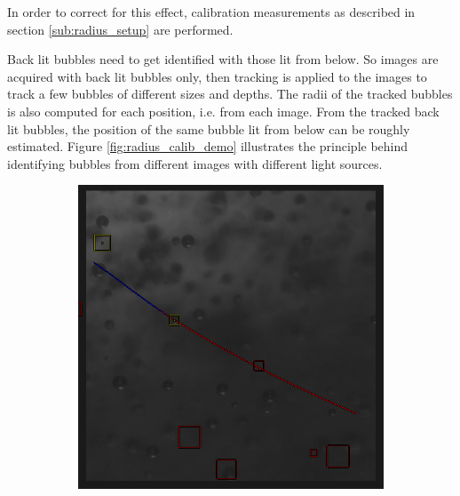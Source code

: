 			In order to correct for this effect, calibration measurements as described in section \ref{sub:radius_setup} are performed.
			
			Back lit bubbles need to get identified with those lit from below. So images are acquired with back lit bubbles only, then tracking is applied to the images to track a few bubbles of different sizes and depths. The radii of the tracked bubbles is also computed for each position, i.e. from each image. From the tracked back lit bubbles, the position of the same bubble lit from below can be roughly estimated. Figure \ref{fig:radius_calib_demo} illustrates the principle behind identifying bubbles from different images with different light sources. 
			
			\begin{figure}	
				\centering
				\begin{subfigure}[t]{.4\textwidth}
					\centering
					\includegraphics[scale=0.45]{images/tracking_green.png}
					\caption{}
					\label{subfig:green_1}
				\end{subfigure}\hfill
				\begin{subfigure}[t]{.4\textwidth}
					\centering

\end{subfigure}
\end{figure}
